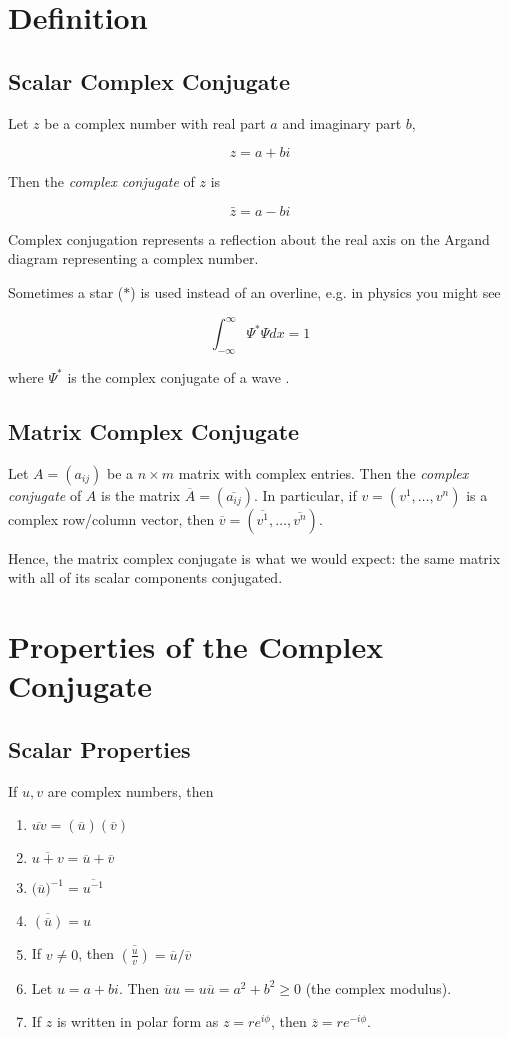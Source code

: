 \documentclass{article}
\newcommand{\ccj}[1]{\overline{#1}}
\begin{document}
\section{Definition}
\subsection{Scalar Complex Conjugate}

Let $z$ be a complex number with real part $a$ and imaginary part $b$,

$$ z = a+bi $$

Then the \emph{complex conjugate} of $z$ is 

$$ \bar{z} = a - bi $$

Complex conjugation represents a reflection about the real axis on the Argand diagram representing a complex number.

Sometimes a star ($*$) is used instead of an overline, e.g. in physics you might see

$$ \int_{-\infty}^{\infty}\Psi^{*}\Psi dx=1 $$

where $\Psi^*$ is the complex conjugate of a wave .

\subsection{Matrix Complex Conjugate}

Let $A=(a_{ij})$ be a $n\times m$ matrix with complex
entries.  Then the \emph{complex conjugate} of $A$ is the matrix
$\ccj{A}=(\ccj{a_{ij}})$. In particular, if
$v=(v^1, \ldots, v^n)$ is a complex row/column vector, then
$\ccj{v}=(\ccj{v^1}, \ldots, \ccj{v^n})$.

Hence, the matrix complex conjugate is what we would expect: the same matrix with all of its scalar components conjugated.

\section{Properties of the Complex Conjugate}

\subsection{Scalar Properties}

If $u,v$ are complex numbers, then

\begin{enumerate}
 \item $\ccj{uv}= (\ccj{u})(\ccj{v})$
 \item $\ccj{u+v}= \ccj{u}+\ccj{v}$
 \item $\big(\ccj{u}\big)^{-1} = \ccj{u^{-1}}$
 \item $\ccj{(\ccj{u})} = u$
 \item If $v\neq 0$, then $\ccj{(\frac{u}{v})} = {\ccj{u}}/{\ccj{v}}$
 \item Let $u = a + bi$.  Then $\ccj{u} u = u \ccj{u} = a^2+b^2 \ge 0$ (the complex modulus).
 \item If $z$ is written in polar form as $z=r e^{i\phi}$, then
$\ccj{z}=re^{-i\phi}$.
\end{enumerate}
\end{document}
